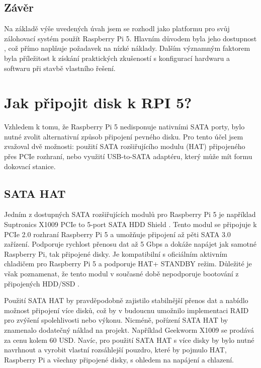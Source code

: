 \documentclass[a4paper,12pt, oneside]{book}
\begin{document}
\subsection{Závěr}



Na základě výše uvedených úvah jsem se rozhodl jako platformu pro svůj
zálohovací systém použít Raspberry Pi 5. Hlavním důvodem byla jeho dostupnost
, což přímo naplňuje
požadavek na nízké náklady. Dalším významným faktorem byla příležitost k získání
praktických zkušeností s konfigurací hardwaru a softwaru při stavbě vlastního
řešení.


\section{Jak připojit disk k RPI 5?}

Vzhledem k tomu, že Raspberry Pi 5 nedisponuje nativními SATA porty, bylo nutné
zvolit alternativní způsob připojení pevného disku. Pro tento účel jsem zvažoval
dvě možnosti: použití SATA rozšiřujícího modulu (HAT) připojeného přes
PCIe rozhraní, nebo využití USB-to-SATA adaptéru, který může mít formu
dokovací stanice.

\subsection{SATA HAT}
Jedním z dostupných SATA rozšiřujících modulů pro Raspberry Pi 5 je například
Suptronics X1009 PCIe to 5-port SATA HDD Shield . Tento modul se připojuje k
PCIe 2.0 rozhraní Raspberry Pi 5 a umožňuje připojení až pěti SATA 3.0 zařízení.
Podporuje rychlost přenosu dat až 5 Gbps a dokáže napájet jak samotné Raspberry
Pi, tak připojené disky. Je kompatibilní s oficiálním aktivním chladičem pro
Raspberry Pi 5 a podporuje HAT+ STANDBY režim. Důležité je však poznamenat, že
tento modul v současné době nepodporuje bootování z připojených HDD/SSD .

Použití SATA HAT by pravděpodobně zajistilo stabilnější přenos dat a nabídlo
možnost připojení více disků, což by v budoucnu umožnilo implementaci RAID pro
zvýšení spolehlivosti nebo výkonu. Nicméně, pořízení SATA HAT by znamenalo
dodatečný náklad na projekt. Například Geekworm X1009 se prodává za cenu kolem
60 USD. Navíc, pro použití SATA HAT s více disky by bylo nutné navrhnout a
vyrobit vlastní rozsáhlejší pouzdro, které by pojmulo HAT, Raspberry Pi a
všechny připojené disky, s ohledem na napájení a chlazení.  
\end{document}
